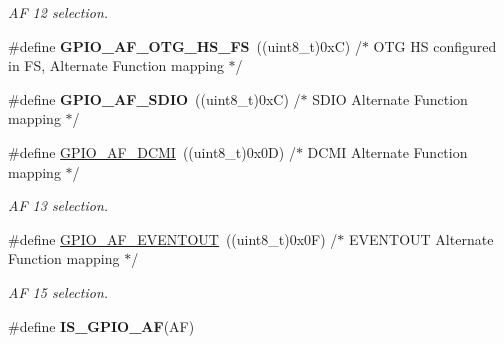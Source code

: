 \begin{DoxyCompactItemize}
\begin{DoxyCompactList}\small\item\em AF 12 selection. \end{DoxyCompactList}\item 
\#define {\bfseries G\+P\+I\+O\+\_\+\+A\+F\+\_\+\+O\+T\+G\+\_\+\+H\+S\+\_\+\+FS}~((uint8\+\_\+t)0x\+C)  /$\ast$ O\+T\+G H\+S configured in F\+S, Alternate Function mapping $\ast$/\hypertarget{group___g_p_i_o___alternat__function__selection__define_ga5f30e17f7328fa05e6dd8b799ae5e6ee}{}\label{group___g_p_i_o___alternat__function__selection__define_ga5f30e17f7328fa05e6dd8b799ae5e6ee}

\item 
\#define {\bfseries G\+P\+I\+O\+\_\+\+A\+F\+\_\+\+S\+D\+IO}~((uint8\+\_\+t)0x\+C)  /$\ast$ S\+D\+I\+O Alternate Function mapping $\ast$/\hypertarget{group___g_p_i_o___alternat__function__selection__define_ga0ae9928f85fc99947659994eb025cc2b}{}\label{group___g_p_i_o___alternat__function__selection__define_ga0ae9928f85fc99947659994eb025cc2b}

\item 
\#define \hyperlink{group___g_p_i_o___alternat__function__selection__define_gaa7bfafac663bac5d437bd6d6a2f6774d}{G\+P\+I\+O\+\_\+\+A\+F\+\_\+\+D\+C\+MI}~((uint8\+\_\+t)0x0\+D)  /$\ast$ D\+C\+M\+I Alternate Function mapping $\ast$/\hypertarget{group___g_p_i_o___alternat__function__selection__define_gaa7bfafac663bac5d437bd6d6a2f6774d}{}\label{group___g_p_i_o___alternat__function__selection__define_gaa7bfafac663bac5d437bd6d6a2f6774d}

\begin{DoxyCompactList}\small\item\em AF 13 selection. \end{DoxyCompactList}\item 
\#define \hyperlink{group___g_p_i_o___alternat__function__selection__define_gacd5e7846b3709cddbf41ece2b1fb068e}{G\+P\+I\+O\+\_\+\+A\+F\+\_\+\+E\+V\+E\+N\+T\+O\+UT}~((uint8\+\_\+t)0x0\+F)  /$\ast$ E\+V\+E\+N\+T\+O\+U\+T Alternate Function mapping $\ast$/\hypertarget{group___g_p_i_o___alternat__function__selection__define_gacd5e7846b3709cddbf41ece2b1fb068e}{}\label{group___g_p_i_o___alternat__function__selection__define_gacd5e7846b3709cddbf41ece2b1fb068e}

\begin{DoxyCompactList}\small\item\em AF 15 selection. \end{DoxyCompactList}\item 
\#define {\bfseries I\+S\+\_\+\+G\+P\+I\+O\+\_\+\+AF}(AF)  
\end{DoxyCompactItemize}


